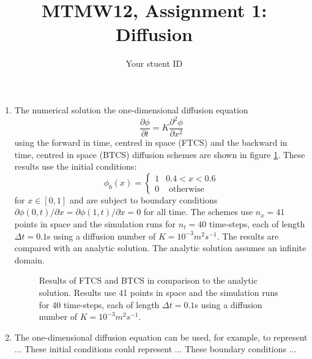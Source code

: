 \documentclass[12pt]{article}
\begin{document}
\thispagestyle{empty}

\title{MTMW12, Assignment 1: Diffusion}
\author{Your stuent ID}
\maketitle


\begin{enumerate}

\item The numerical solution the one-dimensional diffusion equation
\begin{equation}
\frac{\partial\phi}{\partial t}=K\frac{\partial^{2}\phi}{\partial x^{2}}
\end{equation}
using the forward in time, centred in space (FTCS) and the backward
in time, centred in space (BTCS) diffusion schemes are shown in figure
\ref{fig:Q1}. These results use the initial conditions: 
\[
\phi_{0}(x)=\begin{cases}
1 & 0.4<x<0.6\\
0 & \text{ otherwise}
\end{cases}
\]
for $x\in[0,1]$ and are subject to boundary conditions $\partial\phi(0,t)/\partial x=\partial\phi(1,t)/\partial x=0$
for all time. The schemes use $n_{x}=41$ points in space and the
simulation runs for $n_{t}=40$ time-steps, each of length $\Delta t=0.1$s
using a diffusion number of $K=10^{-3}m^{2}s^{-1}$. The results are
compared with an analytic solution. The analytic solution assumes
an infinite domain.


\begin{figure}[!tbh]

\caption{Results of FTCS and BTCS in comparison to the analytic solution. Results
use 41 points in space and the simulation runs for 40 time-steps,
each of length $\Delta t=0.1$s using a diffusion number of $K=10^{-3}m^{2}s^{-1}$.
\label{fig:Q1}}
\end{figure}


\item The one-dimensional diffusion equation can be used, for example, to
represent ...
These initial conditions could represent ...
These boundary conditions ...

\end{enumerate}
\end{document}
